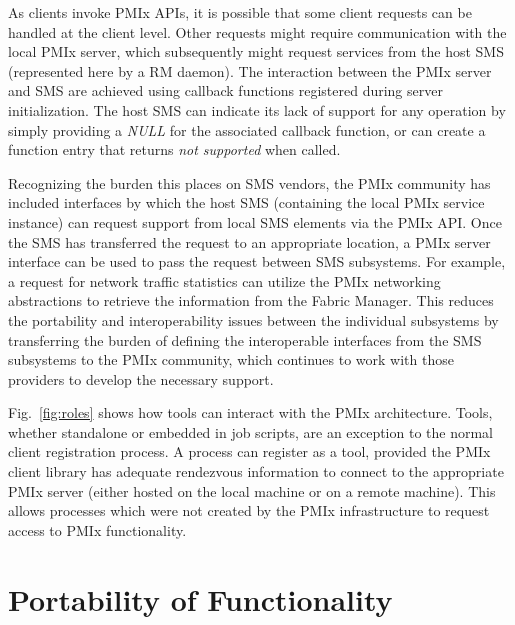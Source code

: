 As clients invoke \ac{PMIx} \acp{API}, it is possible that some client requests can
be handled at the client level.  Other requests might require communication with the
local \ac{PMIx} server, which subsequently might request services from the host \ac{SMS}
(represented here by a \ac{RM} daemon).
The interaction between the \ac{PMIx} server and \ac{SMS} are
achieved using callback functions registered during server initialization.
The host \ac{SMS} can indicate its lack of support for any operation by simply providing a \textit{NULL} for the associated callback function, or can create a function entry that returns \textit{not supported} when called.

Recognizing the burden this places on SMS vendors, the PMIx community has included interfaces by
which the host \ac{SMS} (containing the local PMIx service instance) can request support from local \ac{SMS} elements via the PMIx API.  Once the \ac{SMS} has transferred the request to
an appropriate location, a \ac{PMIx} server interface can be used to pass the request
between \ac{SMS} subsystems.
For example, a request for network traffic statistics can utilize the
PMIx networking abstractions to retrieve the information from the Fabric Manager.
This reduces the portability and
interoperability issues between the individual subsystems by transferring the burden of defining the
interoperable interfaces from the \ac{SMS} subsystems to the \ac{PMIx} community, which continues
to work with those providers to develop the necessary support.

Fig.~\ref{fig:roles} shows how tools can interact with the \ac{PMIx} architecture.
Tools, whether standalone or embedded in job scripts, are an exception to
the normal client registration process.   A process can register as a tool, provided
the \ac{PMIx} client library has adequate rendezvous information to connect to the appropriate
\ac{PMIx} server (either hosted on the local machine or on a remote machine).  This allows processes
which were not created by the PMIx infrastructure to request access to PMIx functionality.

\section{Portability of Functionality}
\label{chap:intro:not_supported}

